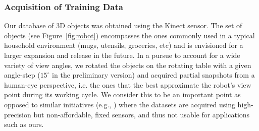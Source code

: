 \documentclass[conference]{sty/IEEEtran}
\begin{document}
\subsubsection{Acquisition of Training Data}
Our database of 3D objects was obtained using the Kinect sensor.
The set of objects (see Figure~\ref{fig:robot}) encompasses the ones commonly used
in a typical household environment (mugs, utensils, groceries, etc) and is envisioned for a
larger expansion and release in the future.  In a pursue to account for a wide variety
of view angles, we rotated the objects on the rotating table with a given
angle-step ($15^\circ$ in the preliminary version) and acquired partial
snapshots from a human-eye perspective, i.e. the ones that the best
approximate the robot's view point during its working cycle.  We consider
this to be an important point as opposed to similar initiatives (e.g.,
\cite{kit}) where the datasets are acquired using high-precision but
non-affordable, fixed sensors, and thus not usable for applications such as ours.

\end{document}
